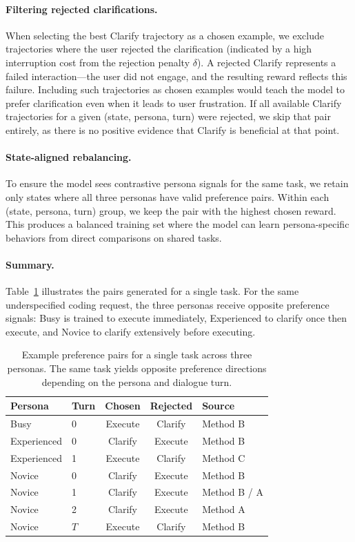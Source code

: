 \paragraph{Filtering rejected clarifications.}
When selecting the best Clarify trajectory as a chosen example, we exclude trajectories where the user rejected the clarification (indicated by a high interruption cost from the rejection penalty $\delta$). A rejected Clarify represents a failed interaction---the user did not engage, and the resulting reward reflects this failure. Including such trajectories as chosen examples would teach the model to prefer clarification even when it leads to user frustration. If all available Clarify trajectories for a given (state, persona, turn) were rejected, we skip that pair entirely, as there is no positive evidence that Clarify is beneficial at that point.

\paragraph{State-aligned rebalancing.}
To ensure the model sees contrastive persona signals for the same task, we retain only states where all three personas have valid preference pairs. Within each (state, persona, turn) group, we keep the pair with the highest chosen reward. This produces a balanced training set where the model can learn persona-specific behaviors from direct comparisons on shared tasks.

\paragraph{Summary.}
Table~\ref{tab:pair-example} illustrates the pairs generated for a single task. For the same underspecified coding request, the three personas receive opposite preference signals: Busy is trained to execute immediately, Experienced to clarify once then execute, and Novice to clarify extensively before executing.

\begin{table}[h]
\centering
\small
\begin{tabular}{llccl}
\toprule
\textbf{Persona} & \textbf{Turn} & \textbf{Chosen} & \textbf{Rejected} & \textbf{Source} \\
\midrule
Busy & 0 & Execute & Clarify & Method B \\
\midrule
Experienced & 0 & Clarify & Execute & Method B \\
Experienced & 1 & Execute & Clarify & Method C \\
\midrule
Novice & 0 & Clarify & Execute & Method B \\
Novice & 1 & Clarify & Execute & Method B / A \\
Novice & 2 & Clarify & Execute & Method A \\
Novice & $T$ & Execute & Clarify & Method B \\
\bottomrule
\end{tabular}
\caption{Example preference pairs for a single task across three personas. The same task yields opposite preference directions depending on the persona and dialogue turn.}
\label{tab:pair-example}
\end{table}

